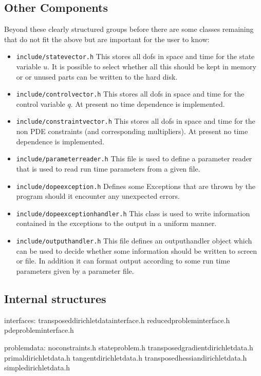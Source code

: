 \subsection{Other Components}
Beyond these clearly structured groups before there are some classes remaining that
do not fit the above but are important for the user to know:
\begin{itemize}
\item {\tt include/statevector.h} This stores all dofs in space and time for the state 
  variable $u$. It is possible to select whether all this should be kept in memory or 
  or unused parts can be written to the hard disk.
\item {\tt include/controlvector.h} This stores all dofs in space and time for the 
  control variable $q$. At present no time dependence is implemented.
\item {\tt include/constraintvector.h} This stores all dofs in space and time for the 
  non PDE constraints (and corresponding multipliers). 
  At present no time dependence is implemented.
\item {\tt include/parameterreader.h} This file is used to define a parameter reader
  that is used to read run time parameters from a given file.
\item {\tt include/dopeexception.h} Defines some Exceptions that are thrown by the program
  should it encounter any unexpected errors.
\item {\tt include/dopeexceptionhandler.h} This class is used to write information 
  contained in the exceptions to the output in a uniform manner.
\item {\tt include/outputhandler.h} This file defines an outputhandler object which 
  can be used to decide whether some information should be written to screen or file.
  In addition it can format output according to some run time parameters given by a 
  parameter file.
\end{itemize}

\subsection{Internal structures}
interfaces:
transposeddirichletdatainterface.h
reducedprobleminterface.h
            pdeprobleminterface.h  

problemdata:
noconstraints.h        stateproblem.h          transposedgradientdirichletdata.h
primaldirichletdata.h  tangentdirichletdata.h  transposedhessiandirichletdata.h
simpledirichletdata.h
